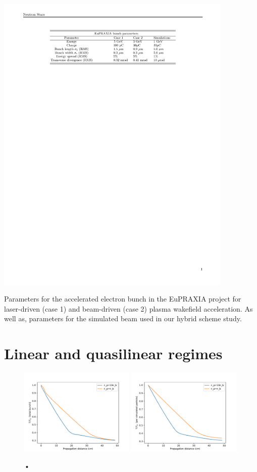 \begin{table}
\centering
\includegraphics[width=0.85\textwidth]{table_eupraxia.pdf}
\caption{Parameters for the accelerated electron bunch in the EuPRAXIA project for laser-driven  (case 1) and beam-driven (case 2) plasma wakefield acceleration. As well as, parameters for the simulated beam used in our hybrid scheme study.}
\label{eupraxia_parameters}
\end{table}

\section{Linear and quasilinear regimes}

\begin{figure}
\centering
\includegraphics[width=0.49\textwidth]{Energies30pc_lowres.pdf}
\includegraphics[width=0.49\textwidth]{Energy30pc_per_particle_lowres.pdf}
\caption{•}
\end{figure}

